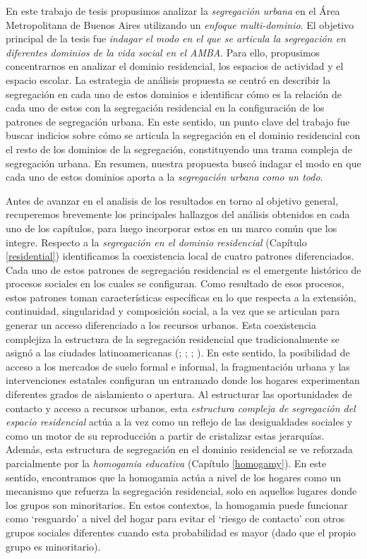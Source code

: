 \documentclass[
  spanish,
  a4paper,%
  chapterprefix=true,%
  DIV=calc,%
  twoside]{scrbook}%
\begin{document}
En este trabajo de tesis propusimos analizar la \emph{segregación urbana} en
el Área Metropolitana de Buenos Aires utilizando un \emph{enfoque
multi-dominio}. El objetivo principal de la tesis fue \emph{indagar el modo
en el que se articula la segregación en diferentes dominios de la vida
social en el AMBA}. Para ello, propusimos concentrarnos en analizar el
dominio residencial, los espacios de actividad y el espacio escolar. La
estrategia de análisis propuesta se centró en describir la segregación
en cada uno de estos dominios e identificar cómo es la relación de cada
uno de estos con la segregación residencial en la configuración de los
patrones de segregación urbana. En este sentido, un punto clave del
trabajo fue buscar indicios sobre cómo se articula la segregación en el
dominio residencial con el resto de los dominios de la segregación,
constituyendo una trama compleja de segregación urbana. En resumen,
nuestra propuesta buscó indagar el modo en que cada uno de estos
dominios aporta a la \emph{segregación urbana} \emph{como un todo}.

Antes de avanzar en el analisis de los resultados en torno al objetivo
general, recuperemos brevemente los principales hallazgos del análisis
obtenidos en cada uno de los capítulos, para luego incorporar estos en
un marco común que los integre. Respecto
a la \emph{segregación en el dominio residencial} (Capítulo
\ref{residential}) identificamos la coexistencia local de cuatro
patrones diferenciados. Cada uno de estos patrones de segregación
residencial es el emergente histórico de procesos sociales en los cuales
se configuran. Como resultado de esos procesos, estos patrones toman
características específicas en lo que respecta a la extensión,
continuidad, singularidad y composición social, a la vez que se
articulan para generar un acceso diferenciado a los recursos urbanos.
Esta coexistencia complejiza la estructura de la segregación residencial
que tradicionalmente se asignó a las ciudades latinoamericanas
(; ; ; ). En
este sentido, la posibilidad de acceso a los mercados de suelo formal e
informal, la fragmentación urbana y las intervenciones estatales
configuran un entramado donde los hogares experimentan diferentes grados
de aislamiento o apertura. Al estructurar las oportunidades de
contacto y acceso a recursos urbanos, esta \emph{estructura compleja de
segregación del espacio residencial} actúa a la vez como un reflejo de
las desigualdades sociales y como un motor de su reproducción a partir
de cristalizar estas jerarquías. Además,
esta estructura de segregación en el dominio residencial se ve reforzada
parcialmente por la \emph{homogamia educativa} (Capítulo \ref{homogamy}). En
este sentido, encontramos que la homogamia actúa a nivel de los hogares
como un mecanismo que refuerza la segregación residencial, solo en
aquellos lugares donde los grupos son minoritarios. En estos contextos,
la homogamia puede funcionar como `resguardo' a nivel del hogar para
evitar el `riesgo de contacto' con otros grupos sociales diferentes
cuando esta probabilidad es mayor (dado que el propio grupo es
minoritario).
\end{document}
